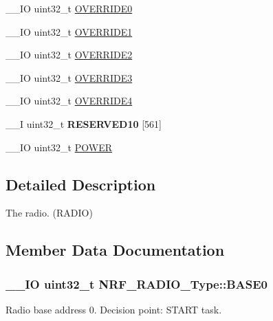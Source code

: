 \begin{DoxyCompactItemize}
\item 
\+\_\+\+\_\+\+I\+O uint32\+\_\+t \hyperlink{struct_n_r_f___r_a_d_i_o___type_a0c448f83d2d50168ec26040395823e44}{O\+V\+E\+R\+R\+I\+D\+E0}
\item 
\+\_\+\+\_\+\+I\+O uint32\+\_\+t \hyperlink{struct_n_r_f___r_a_d_i_o___type_abd206bcf23a79392567ebc59192e2f22}{O\+V\+E\+R\+R\+I\+D\+E1}
\item 
\+\_\+\+\_\+\+I\+O uint32\+\_\+t \hyperlink{struct_n_r_f___r_a_d_i_o___type_a08b630b4fd9b8ce8b3ab3c558c4822f9}{O\+V\+E\+R\+R\+I\+D\+E2}
\item 
\+\_\+\+\_\+\+I\+O uint32\+\_\+t \hyperlink{struct_n_r_f___r_a_d_i_o___type_a1ac0754b4e75c13ab1d426ad052193ae}{O\+V\+E\+R\+R\+I\+D\+E3}
\item 
\+\_\+\+\_\+\+I\+O uint32\+\_\+t \hyperlink{struct_n_r_f___r_a_d_i_o___type_a3fad637d3903b0a9377d4ec05fed983b}{O\+V\+E\+R\+R\+I\+D\+E4}
\item 
\hypertarget{struct_n_r_f___r_a_d_i_o___type_a0967814501b9667f52d14582ae0a970f}{}\+\_\+\+\_\+\+I uint32\+\_\+t {\bfseries R\+E\+S\+E\+R\+V\+E\+D10} \mbox{[}561\mbox{]}\label{struct_n_r_f___r_a_d_i_o___type_a0967814501b9667f52d14582ae0a970f}

\item 
\+\_\+\+\_\+\+I\+O uint32\+\_\+t \hyperlink{struct_n_r_f___r_a_d_i_o___type_aecf36ae72786e29724e9c41dedf78124}{P\+O\+W\+E\+R}
\end{DoxyCompactItemize}


\subsection{Detailed Description}
The radio. (R\+A\+D\+I\+O) 

\subsection{Member Data Documentation}
\hypertarget{struct_n_r_f___r_a_d_i_o___type_a9149b02b27abc85e89c94ce0497c0878}{}
\subsubsection[{B\+A\+S\+E0}]{\setlength{\rightskip}{0pt plus 5cm}\+\_\+\+\_\+\+I\+O uint32\+\_\+t N\+R\+F\+\_\+\+R\+A\+D\+I\+O\+\_\+\+Type\+::\+B\+A\+S\+E0}\label{struct_n_r_f___r_a_d_i_o___type_a9149b02b27abc85e89c94ce0497c0878}
Radio base address 0. Decision point\+: S\+T\+A\+R\+T task. \hypertarget{struct_n_r_f___r_a_d_i_o___type_a28dd58aec73dd60b82f51bfb30078a74}{}
